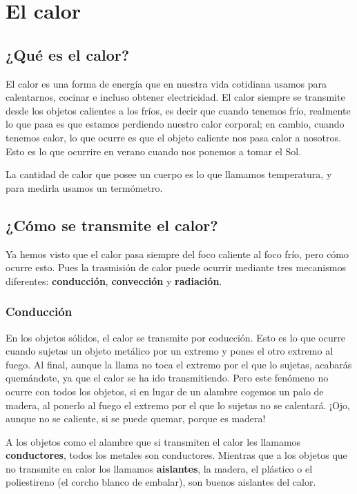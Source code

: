 \chapter{El calor}

\section{¿Qué es el calor?}

El calor es una forma de energía que en nuestra vida cotidiana usamos para calentarnos, cocinar e incluso obtener electricidad. El calor siempre se transmite desde los objetos calientes a los fríos, es decir que cuando tenemos frío, realmente lo que pasa es que estamos perdiendo nuestro calor corporal; en cambio, cuando tenemos calor, lo que ocurre es que el objeto caliente nos pasa calor a nosotros. Esto es lo que ocurrire en verano cuando nos ponemos a tomar el Sol.

La cantidad de calor que posee un cuerpo es lo que llamamos temperatura, y para medirla usamos un termómetro.

\section{¿Cómo se transmite el calor?}

Ya hemos visto que el calor pasa siempre del foco caliente al foco frío, pero cómo ocurre esto. Pues la trasmisión de calor puede ocurrir mediante tres mecanismos diferentes: \textbf{conducción}, \textbf{convección} y \textbf{radiación}.

\subsection{Conducción}

En los objetos sólidos, el calor se transmite por coducción. Esto es lo que ocurre cuando sujetas un objeto metálico por un extremo y pones el otro extremo al fuego. Al final, aunque la llama no toca el extremo por el que lo sujetas, acabarás quemándote, ya que el calor se ha ido transmitiendo. Pero este fenómeno no ocurre con todos los objetos, si en lugar de un alambre cogemos un palo de madera, al ponerlo al fuego el extremo por el que lo sujetas no se calentará. ¡Ojo, aunque no se caliente, si se puede quemar, porque es madera!

A los objetos como  el alambre que si transmiten el calor les llamamos \textbf{conductores}, todos los metales son conductores. Mientras que a los objetos que no transmite en calor los llamamos \textbf{aislantes}, la madera, el plástico o el poliestireno (el corcho blanco de embalar), son buenos aislantes del calor.

